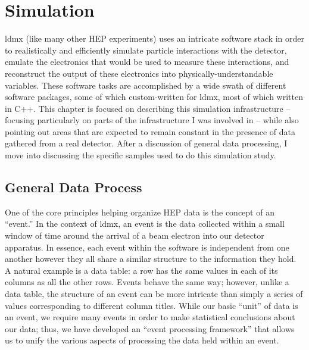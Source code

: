 \chapter{Simulation}
\label{chapter:ldmx:simulation}

\ac{ldmx} (like many other HEP experiments) uses an intricate software stack in order to realistically and efficiently simulate particle interactions with the detector, emulate the electronics that would be used to measure these interactions, and reconstruct the output of these electronics into physically-understandable variables.
These software tasks are accomplished by a wide swath of different software packages, some of which custom-written for \ac{ldmx}, most of which written in C++.
This chapter is focused on describing this simulation infrastructure -- focusing particularly on parts of the infrastructure I was involved in -- while also pointing out areas that are expected to remain constant in the presence of data gathered from a real detector.
After a discussion of general data processing, I move into discussing the specific samples
used to do this simulation study.

\section{General Data Process}
One of the core principles helping organize HEP data is the concept of an ``event.'' In the context
of \ac{ldmx}, an event is the data collected within a small window of time around the arrival of a
beam electron into our detector apparatus. In essence, each event within the software is
independent from one another however they all share a similar structure to the information they
hold. A natural example is a data table: a row has the same values in each of its columns as all
the other rows. Events behave the same way; however, unlike a data table, the structure of an event
can be more intricate than simply a series of values corresponding to different column titles.
While our basic ``unit'' of data is an event, we require many events in order to make statistical
conclusions about our data; thus, we have developed an ``event processing framework'' that allows
us to unify the various aspects of processing the data held within an event.

